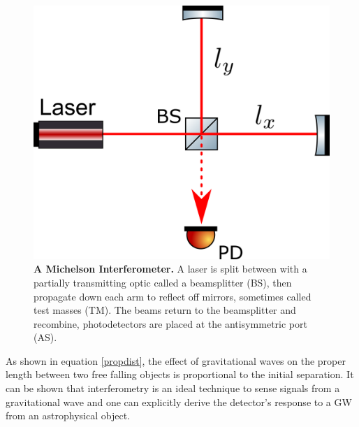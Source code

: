 	\begin{figure}[ht]
		\centering
		\includegraphics[width=.45 \textwidth]{../Figures/SimpleMichelson.png}
		\caption[A Michelson Interferometer.]  
		{\textbf{A Michelson Interferometer.} A laser is split between with a partially transmitting optic called a beamsplitter (BS), then propagate down each arm to reflect off mirrors, sometimes called test masses (TM).  The beams return to the beamsplitter and recombine, photodetectors are placed at the antisymmetric port (AS).   }
		\label{fig:simple_michelson}
	\end{figure}
	As shown in equation \ref{propdist}, the effect of gravitational waves on the proper length between two free falling objects is proportional to the initial separation.  It can be shown that interferometry is an ideal technique to sense signals from a gravitational wave and one can explicitly derive the detector's response to a GW from an astrophysical object.  
	

